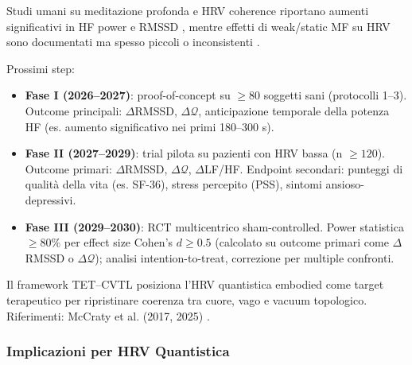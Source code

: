 \documentclass[11pt,a4paper]{article}
\let\oldcite\cite
\renewcommand{\cite}{\protect\oldcite}
\theoremstyle{plain}
\theoremstyle{definition}
\begin{document}
Studi umani su meditazione profonda e HRV coherence riportano aumenti significativi in HF power e RMSSD \cite{McCraty2017newfrontiers, McCraty2025coherence, Elbers2025dysregulation}, mentre effetti di weak/static MF su HRV sono documentati ma spesso piccoli o inconsistenti \cite{Mansourian2023EMFmeta, Vieira2022geomagneticHRV, Kaspranski2025human}.

\vspace{0.2cm}

Prossimi step:

\begin{itemize}
    \item \textbf{Fase I (2026--2027)}: proof-of-concept su $\geq 80$ soggetti sani (protocolli 1--3). Outcome principali: $\Delta$RMSSD, $\Delta\mathcal{Q}$, anticipazione temporale della potenza HF (es. aumento significativo nei primi 180--300 s).
    
    \item \textbf{Fase II (2027--2029)}: trial pilota su pazienti con HRV bassa (n $\geq 120$). Outcome primari: $\Delta$RMSSD, $\Delta\mathcal{Q}$, $\Delta$LF/HF. Endpoint secondari: punteggi di qualità della vita (es. SF-36), stress percepito (PSS), sintomi ansioso-depressivi.
    
    \item \textbf{Fase III (2029--2030)}: RCT multicentrico sham-controlled. Power statistica $\geq 80\%$ per effect size Cohen's $d \geq 0.5$ (calcolato su outcome primari come $\Delta$RMSSD o $\Delta\mathcal{Q}$); analisi intention-to-treat, correzione per multiple confronti.
\end{itemize}

Il framework TET--CVTL posiziona l’HRV quantistica embodied come target terapeutico per ripristinare coerenza tra cuore, vago e vacuum topologico. Riferimenti: McCraty et al. (2017, 2025) \cite{McCraty2017newfrontiers, McCraty2025coherence}.





\subsubsection{Implicazioni per HRV Quantistica}


\vspace{0.2cm}
\end{document}
